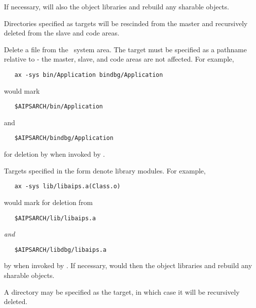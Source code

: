 \begin{description}
   \noindent
   If necessary,  will also  the object
   libraries and rebuild any sharable objects.

   \noindent
   Directories specified as targets will be rescinded from the master and
   recursively deleted from the slave and code areas.

\item[\exe{-sys}]
   Delete a file from the \aipspp\ system area.  The target must be
   specified as a pathname relative to  - the master, slave,
   and code areas are not affected.  For example,

\begin{verbatim}
   ax -sys bin/Application bindbg/Application
\end{verbatim}

   \noindent
   would mark

\begin{verbatim}
   $AIPSARCH/bin/Application
\end{verbatim}

   and

\begin{verbatim}
   $AIPSARCH/bindbg/Application
\end{verbatim}

   \noindent
   for deletion by  when invoked by .

   \noindent
   Targets specified in the form  denote library modules.  For
   example,

\begin{verbatim}
   ax -sys lib/libaips.a(Class.o)
\end{verbatim}

   \noindent
   would mark  for deletion from

\begin{verbatim}
   $AIPSARCH/lib/libaips.a
\end{verbatim}

   {\em and}

\begin{verbatim}
   $AIPSARCH/libdbg/libaips.a
\end{verbatim}

   \noindent
   by  when invoked by .  If necessary,
    would then  the object libraries and
   rebuild any sharable objects.

   \noindent
   A directory may be specified as the target, in which case it will be
   recursively deleted.


\end{description}
